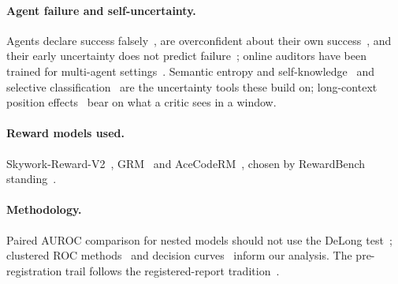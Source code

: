 \documentclass[11pt]{article}
\begin{document}
\paragraph{Agent failure and self-uncertainty.} Agents declare success falsely~\citep{advani2026silent}, are overconfident about their own success~\citep{kaddour2026agentic}, and their early uncertainty does not predict failure~\citep{li2026laststep}; online auditors have been trained for multi-agent settings~\citep{zhang2026agentforesight}. Semantic entropy and self-knowledge~\citep{farquhar2024semantic,kadavath2022know} and selective classification~\citep{geifman2017selective} are the uncertainty tools these build on; long-context position effects~\citep{liu2024lost} bear on what a critic sees in a window.

\paragraph{Reward models used.} Skywork-Reward-V2~\citep{liu2025skywork2}, GRM~\citep{yang2024grm} and AceCodeRM~\citep{zeng2025acecoder}, chosen by RewardBench standing~\citep{lambert2024rewardbench,malik2025rewardbench2}.

\paragraph{Methodology.} Paired AUROC comparison for nested models should not use the DeLong test~\citep{demler2012misuse,pepe2013testing}; clustered ROC methods~\citep{obuchowski1997nonparametric} and decision curves~\citep{vickers2006decision} inform our analysis. The pre-registration trail follows the registered-report tradition~\citep{nosek2018preregistration,chambers2022registered}.
\end{document}
